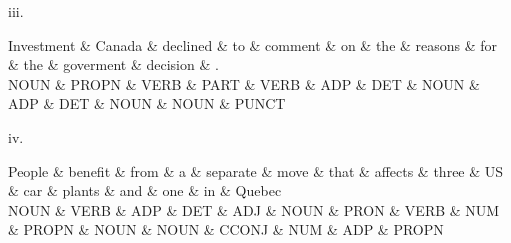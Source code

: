 iii. \\
\begin{center}
 {\small

 \begin{dependency}[] 
 \begin{deptext}
Investment \& Canada \& declined \& to \& comment \& on \& the \& reasons \& for \& the \& goverment \& decision \& . \\
NOUN \& PROPN \& VERB \& PART \& VERB \& ADP \& DET \& NOUN \& ADP \& DET \& NOUN \& NOUN \& PUNCT \\
\end{deptext}
\end{dependency}

 }
 \end{center}

iv. \\
 \begin{center}
 {\small
 \begin{dependency}[] 
 \begin{deptext}
People \& benefit \& from \& a \& separate \& move \& that \& affects \& three \& US \& car \& plants \& and \& one \& in \& Quebec \\
NOUN \& VERB \& ADP \& DET \& ADJ \& NOUN \& PRON \& VERB \& NUM \& PROPN \& NOUN \& NOUN \& CCONJ \& NUM \& ADP \& PROPN \\
\end{deptext}
\end{dependency}
 }
 \end{center}


